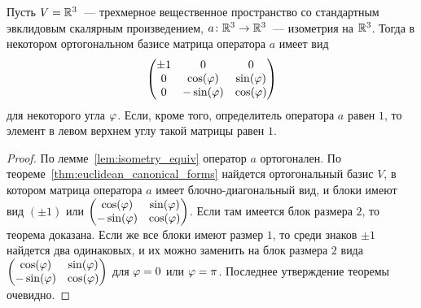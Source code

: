 \begin{corollary}
Пусть $V = \mathbb R^3$~--- трехмерное вещественное пространство со
стандартным эвклидовым скалярным произведением, $a\colon\mathbb
R^3\to\mathbb R^3$~--- изометрия на $\mathbb R^3$. Тогда в некотором
ортогональном базисе матрица оператора $a$ имеет вид
$$
\begin{pmatrix}
\pm 1 & 0 & 0\\
0 & \cos(\varphi) & \sin(\varphi)\\
0 & -\sin(\varphi) & \cos(\varphi)
\end{pmatrix}
$$
для некоторого угла $\varphi$.
Если, кроме того, определитель оператора $a$ равен $1$, то элемент в
левом верхнем углу такой матрицы равен $1$.
\end{corollary}
\begin{proof}
По лемме~\ref{lem:isometry_equiv} оператор $a$ ортогонален. По
теореме~\ref{thm:euclidean_canonical_forms} найдется ортогональный
базис $V$, в котором матрица оператора $a$ имеет блочно-диагональный
вид, и блоки имеют вид $(\pm 1)$ или
$\begin{pmatrix}\cos(\varphi)&\sin(\varphi)\\-\sin(\varphi)&\cos(\varphi)\end{pmatrix}$. Если
там имеется блок размера $2$, то теорема доказана. Если же все блоки
имеют размер $1$, то среди знаков $\pm 1$ найдется два одинаковых, и
их можно заменить на блок размера $2$ вида
$\begin{pmatrix}\cos(\varphi)&\sin(\varphi)\\-\sin(\varphi)&\cos(\varphi)\end{pmatrix}$
для $\varphi=0$ или $\varphi = \pi$. Последнее утверждение теоремы очевидно.
\end{proof}

